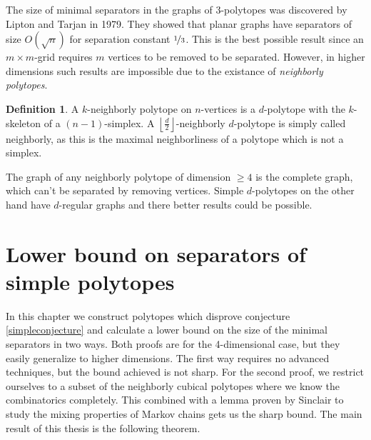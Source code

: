 \documentclass[a4paper,12pt]{book}
\theoremstyle{plain}
\newtheorem{conjecture}[theorem]{Conjecture}
\theoremstyle{definition}
\newtheorem{definition}[theorem]{Definition}
\newcommand\NC{\textrm{NCP}}
\begin{document}
The size of minimal separators in the graphs of 3-polytopes was discovered by 
Lipton and Tarjan \cite{LiTa} in 1979. They showed that planar graphs have 
separators of size $O(\sqrt{n})$ for separation constant $\nicefrac{1}{3}$. This is 
the best possible result since an $m\times m$-grid requires $m$ vertices to be 
removed to be separated. However, in higher dimensions such results are 
impossible due to the existance of \textit{neighborly polytopes}.

\begin{definition}
 A $k$-neighborly polytope on $n$-vertices is a $d$-polytope with the $k$-skeleton of a $(n-1)$-simplex.
A $\left\lfloor \frac{d}{2} \right\rfloor$-neighborly $d$-polytope is simply called neighborly, as this is the maximal
neighborliness of a polytope which is not a simplex.
\end{definition}

The graph of any neighborly polytope of dimension $\geq 4$ is the complete graph, which can't be separated by removing vertices. Simple 
$d$-polytopes on the other hand have $d$-regular graphs and there better results could be 
possible. 

%
%
%
%


\chapter{Lower bound on separators of simple polytopes}
\label{ncpconstruction}

In this chapter we construct polytopes which disprove conjecture \ref{simpleconjecture} and
calculate a lower bound on the size of the minimal separators in two ways. Both proofs are for the
4-dimensional case, but they easily generalize to higher dimensions. The first way requires
no advanced techniques, but the bound achieved is not sharp. For the second proof,
we restrict ourselves to a subset of the neighborly cubical polytopes where we know the 
combinatorics completely. This combined with a lemma proven by Sinclair to study
the mixing properties of Markov chains gets us the sharp bound. The main result of this
thesis is the following theorem.
\end{document}
